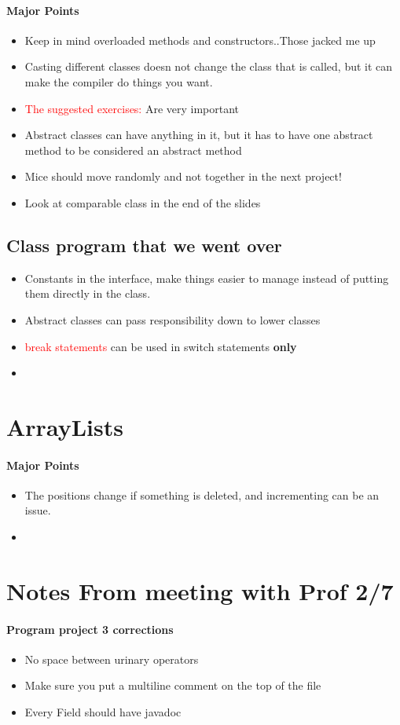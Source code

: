 \documentclass{article}
\begin{document}
\paragraph{Major Points}

\begin{itemize}
  \item Keep in mind overloaded methods and constructors..Those jacked me up
  \item Casting different classes doesn not change the class that is called, but
  it can make the compiler do things you want. 
  \item \textcolor{red}{The suggested exercises:} Are very important  
  \item Abstract classes can have anything in it, but it has to have one
  abstract method to be considered an abstract method
  \item Mice should move randomly and not together in the next project!
  \item Look at comparable class in the end of the slides
\end{itemize}

\subsection{Class program that we went over}

\begin{itemize}
  \item Constants in the interface, make things easier to manage instead of
  putting them directly in the class.
  \item Abstract classes can pass responsibility down to lower classes
  \item \textcolor{red}{break statements} can be used in switch statements
  \textbf{only}
  \item 
\end{itemize}

\section{ArrayLists}
\paragraph{Major Points}

\begin{itemize}
  \item The positions change if something is deleted, and incrementing can be an
  issue.
  \item 
\end{itemize}

\section{Notes From meeting with Prof 2/7}

\paragraph{Program project 3 corrections}

\begin{itemize}
  \item No space between urinary operators 
  \item Make sure you put a multiline comment on the top of the file
  \item Every Field should have javadoc 
\end{itemize}
\end{document}

